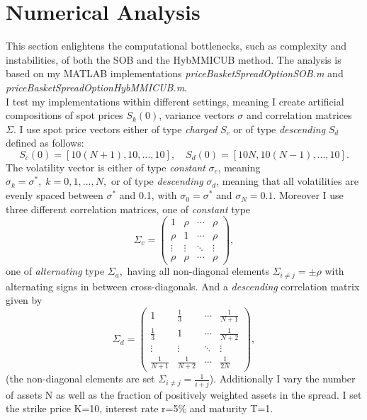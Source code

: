 \documentclass[a4paper]{article}
\begin{document}
\newpage
\section{Numerical Analysis}
\label{sec:na}
This section enlightens the computational bottlenecks, such as complexity and instabilities, of both the SOB and the HybMMICUB method. The analysis is based on my MATLAB implementations \emph{priceBasketSpreadOptionSOB.m} and \emph{priceBasketSpreadOptionHybMMICUB.m}.\\
I test my implementations within different settings, meaning I create artificial compositions of spot prices $S_k(0)$, variance vectors $\sigma$ and correlation matrices $\Sigma$. I use spot price vectors either of type \emph{charged} $S_c$ or of type \emph{descending} $S_d$ defined as follows: 
$$S_{c}(0) = [10(N+1), 10, ..., 10],\quad S_{d}(0) = [10N, 10(N-1), ..., 10].$$  
The volatility vector is either of type \emph{constant} $\sigma_c$, meaning $\sigma_k = \sigma^*,\;k=0,1,...,N,$ or of  type \emph{descending} $\sigma_d$, meaning that all volatilities are evenly spaced between $\sigma^*$ and 0.1, with $\sigma_0 = \sigma^*$ and $\sigma_N = 0.1$.
Moreover I use three different correlation matrices, one of \emph{constant} type
$$\Sigma_{c} =\begin{pmatrix}1 & \rho & \cdots & \rho \\ \rho & 1 & \cdots & \rho \\ \vdots & \vdots & \ddots & \vdots \\ \rho & \rho & \cdots & \rho \end{pmatrix}  ,$$
one of \emph{alternating} type $\Sigma_{a},$ having all non-diagonal elements $\Sigma_{i\neq j} = \pm \rho$ with alternating signs in between cross-diagonals. And a \emph{descending} correlation matrix given by
$$\Sigma_{d} = \begin{pmatrix}1 & \frac{1}{3} & \cdots & \frac{1}{N+1} \\ \frac{1}{3} & 1 & \cdots & \frac{1}{N+2} \\ \vdots & \vdots & \ddots & \vdots \\ \frac{1}{N+1} & \frac{1}{N+2} & \cdots & \frac{1}{2N} \end{pmatrix},$$
(the non-diagonal elements are set  $\Sigma_{i\neq j} = \frac{1}{i+j}$).
Additionally I vary the number of assets N as well as the fraction of positively weighted assets in the spread. I set the strike price K=10, interest rate  r=5\% and maturity T=1. 
\end{document}

